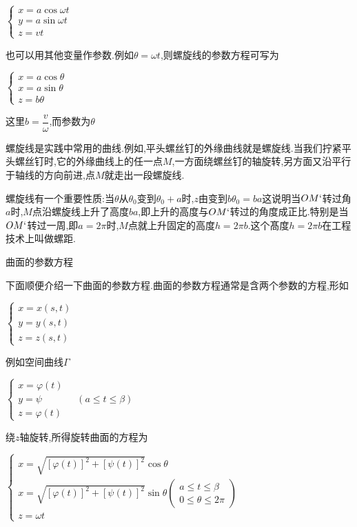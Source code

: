 \documentclass[oneside]{book}
\begin{document}
$\left\{\begin{array}{l}{x=a \cos \omega t} \\ {y=a \sin \omega t} \\ {z=v t}\end{array}\right.$

也可以用其他变量作参数.例如$\theta  = \omega t$,则螺旋线的参数方程可写为

$\left\{\begin{array}{l}{x=a \cos \theta} \\ {x=a \sin \theta} \\ {z=b \theta}\end{array}\right.$

这里$b = \dfrac{v}{\omega }$,而参数为$\theta $

螺旋线是实践中常用的曲线.例如,平头螺丝钉的外缘曲线就是螺旋线.当我们拧紧平头螺丝钉时,它的外缘曲线上的任一点$M$,一方面绕螺丝钉的轴旋转,另方面又沿平行于轴线的方向前进,点$M$就走出一段螺旋线.

螺旋线有一个重要性质:当$\theta $从${\theta _0}$变到${\theta _0} + a$时,$z$由变到$b{\theta _0} = ba$这说明当$OM`$转过角$a$时,$M$点沿螺旋线上升了高度$ba$,即上升的高度与$OM`$转过的角度成正比.特别是当$OM`$转过一周,即$a = 2\pi $时,$M$点就上升固定的高度$h = 2\pi b$.这个髙度$h = 2\pi b$在工程技术上叫做螺距.

曲面的参数方程

下面顺便介绍一下曲面的参数方程.曲面的参数方程通常是含两个参数的方程,形如

$\left\{\begin{array}{l}{x=x(s, t)} \\ {y=y(s, t)} \\ {z=z(s, t)}\end{array}\right.$

例如空间曲线$\Gamma $

$\left\{\begin{array}{l}{x=\varphi(t)} \\ {y=\psi} \\ {z=\varphi(t)}\end{array} \quad(a \leq t \leq \beta)\right.$

绕$z$轴旋转,所得旋转曲面的方程为

$\left\{\begin{array}{l}{x=\sqrt{[\varphi(t)]^{2}+[\psi(t)]^{2}} \cos \theta} \\ {x=\sqrt{[\varphi(t)]^{2}+[\psi(t)]^{2}} \sin \theta\left(\begin{array}{l}{a \leq t \leq \beta} \\ {0 \leq \theta \leq 2 \pi}\end{array}\right)} \\ {z=\omega t}\end{array}\right.$
\end{document}
